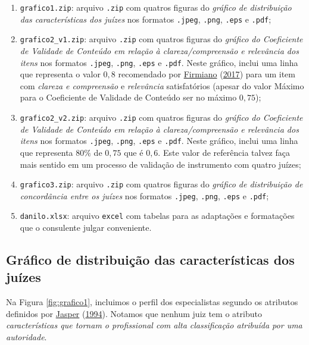 \documentclass[
]{article}
\providecommand{\tightlist}{%
  \setlength{\itemsep}{0pt}\setlength{\parskip}{0pt}}
\begin{document}
\begin{enumerate}
\def\labelenumi{\arabic{enumi}.}
\tightlist
\item
  \texttt{grafico1.zip}: arquivo \texttt{.zip} com quatros figuras do \emph{gráfico de distribuição das características dos juízes} nos formatos \texttt{.jpeg}, \texttt{.png}, \texttt{.eps} e \texttt{.pdf};
\item
  \texttt{grafico2\_v1.zip}: arquivo \texttt{.zip} com quatros figuras do \emph{gráfico do Coeficiente de Validade de Conteúdo em relação à clareza/compreensão e relevância dos itens} nos formatos \texttt{.jpeg}, \texttt{.png}, \texttt{.eps} e \texttt{.pdf}. Neste gráfico, inclui uma linha que representa o valor \(0,8\) recomendado por \protect\hyperlink{ref-firmiano2017escala}{Firmiano} (\protect\hyperlink{ref-firmiano2017escala}{2017}) para um item com \emph{clareza e compreensão} e \emph{relevância} satisfatórios (apesar do valor Máximo para o Coeficiente de Validade de Conteúdo ser no máximo \(0,75\));
\item
  \texttt{grafico2\_v2.zip}: arquivo \texttt{.zip} com quatros figuras do \emph{gráfico do Coeficiente de Validade de Conteúdo em relação à clareza/compreensão e relevância dos itens} nos formatos \texttt{.jpeg}, \texttt{.png}, \texttt{.eps} e \texttt{.pdf}. Neste gráfico, inclui uma linha que representa \(80\%\) de \(0,75\) que é \(0,6\). Este valor de referência talvez faça mais sentido em um processo de validação de instrumento com quatro juízes;
\item
  \texttt{grafico3.zip}: arquivo \texttt{.zip} com quatros figuras do \emph{gráfico de distribuição de concordância entre os juízes} nos formatos \texttt{.jpeg}, \texttt{.png}, \texttt{.eps} e \texttt{.pdf};
\item
  \texttt{danilo.xlsx}: arquivo \texttt{excel} com tabelas para as adaptações e formatações que o consulente julgar conveniente.
\end{enumerate}

\newpage

\hypertarget{gruxe1fico-de-distribuiuxe7uxe3o-das-caracteruxedsticas-dos-juuxedzes}{%
\subsection{Gráfico de distribuição das características dos juízes}\label{gruxe1fico-de-distribuiuxe7uxe3o-das-caracteruxedsticas-dos-juuxedzes}}

Na Figura \ref{fig:grafico1}, incluimos o perfil dos especialistas segundo os atributos definidos por \protect\hyperlink{ref-jasper1994expert}{Jasper} (\protect\hyperlink{ref-jasper1994expert}{1994}). Notamos que nenhum juiz tem o atributo \emph{características que tornam o profissional com alta classificação atribuída por uma autoridade}.
\end{document}
